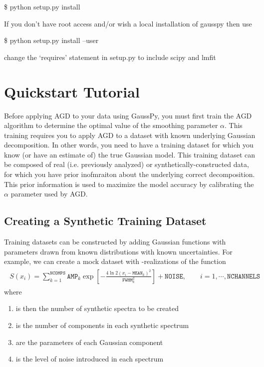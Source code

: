 \documentclass[letterpaper,10pt,openany,oneside]{sphinxmanual}
\begin{document}
\$ python setup.py install

If you don't have root access and/or wish a local installation of
gausspy then use

\$ python setup.py install --user

change the `requires' statement in setup.py to include scipy and lmfit


\chapter{Quickstart Tutorial}
\label{tutorial::doc}\label{tutorial:quickstart-tutorial}\label{tutorial:tutorial}
Before applying AGD to your data using GaussPy, you must first train the AGD algorithm to determine the optimal value of the smoothing parameter \(\alpha\). This training requires you to apply AGD to a dataset with known underlying Gaussian decomposition. In other words, you need to have a training dataset for which you know (or have an estimate of) the true Gaussian model. This training dataset can be composed of real (i.e. previously analyzed) or synthetically-constructed data, for which you have prior inofmraiton about the underlying correct decomposition. This prior information is used to maximize the model accuracy by calibrating the \(\alpha\) parameter used by AGD.


\section{Creating a Synthetic Training Dataset}
\label{tutorial:creating-a-synthetic-training-dataset}
Training datasets can be constructed by adding Gaussian functions with
parameters drawn from known distributions with known
uncertainties. For example, we can create a mock dataset with
-realizations of the function
\label{tutorial:equation-spectra}\begin{gather}
\begin{split}S(x_i) = \sum_{k=1}^{\texttt{NCOMPS}} {\texttt{AMP}_k} \exp\left[-\frac{4\ln 2 (x_i
- \texttt{MEAN}_k)^2}{\texttt{FWHM}_k^2} \right] + \texttt{NOISE},
  \qquad i = 1, \cdots, \texttt{NCHANNELS}\end{split}\label{tutorial-spectra}
\end{gather}
where
\begin{enumerate}
\item {} 
 is then the number of synthetic spectra to be created

\item {} 
 is the number of components in each synthetic spectrum

\item {} 
 are the parameters of each Gaussian component

\item {} 
 is the level of noise introduced in each spectrum

\end{enumerate}
\end{document}
